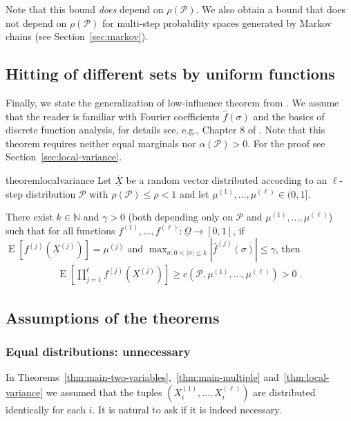 \documentclass{daj}
\newcommand{\1}{\mathbbm{1}}
\theoremstyle{plain}
\theoremstyle{definition}
\DeclareMathOperator*{\EE}{E}
\newcommand{\cP}{\mathcal{P}}
\begin{document}
Note that this bound \emph{does} depend on $\rho(\mathcal{P})$.
We also obtain a bound that does not depend on $\rho(\mathcal{P})$
for multi-step probability spaces generated by Markov chains
(see Section~\ref{sec:markov}).

\subsection{Hitting of different sets by uniform functions}

Finally, we state the generalization of low-influence theorem from
\cite{Mos10}. We assume that the reader is familiar with
Fourier coefficients $\hat{f}(\sigma)$ and the basics of discrete function 
analysis, for details see, e.g., Chapter 8 of \cite{Dol14}.
Note that this theorem requires neither equal marginals
nor $\alpha(\cP) > 0$.
For the proof see Section~\ref{sec:local-variance}.

\begin{restatable}{theorem}{localvariance}
\label{thm:local-variance}
Let $\overline{\underline{X}}$ be a random vector distributed according
to an $\ell$-step distribution $\cP$ with $\rho(\cP) \le \rho < 1$ and
let $\mu^{(1)}, \ldots, \mu^{(\ell)} \in (0, 1]$. 

There exist
$k \in \mathbb{N}$ and $\gamma > 0$ (both depending only
on $\cP$ and $\mu^{(1)}, \ldots, \mu^{(\ell)}$) such that for all functions
$f^{(1)}, \ldots, f^{(\ell)}: \underline{\Omega} \to [0, 1]$,
if $\EE[f^{(j)}(\underline{X}^{(j)})] = \mu^{(j)}$ and
$\max_{\sigma: 0 < |\sigma| \le k} 
|\hat{f}^{(j)}(\sigma)| \le \gamma$, then
\begin{align}
\label{eq:89a}
\EE\left[\prod_{j=1}^{\ell} f^{(j)}(\underline{X}^{(j)}) \right]
\geq c(\cP, \mu^{(1)}, \ldots, \mu^{(\ell)}) > 0 \; .
\end{align}
\end{restatable}

\subsection{Assumptions of the theorems}

\subsubsection{Equal distributions: unnecessary}
\label{sec:equal-distributions}
In Theorems~\ref{thm:main-two-variables},~\ref{thm:main-multiple}
and~\ref{thm:local-variance}  we assumed that the tuples 
$(X_i^{(1)},\ldots,X_i^{(\ell)})$ are distributed 
identically for each $i$.
It is natural to ask if it is indeed necessary.
\end{document}

